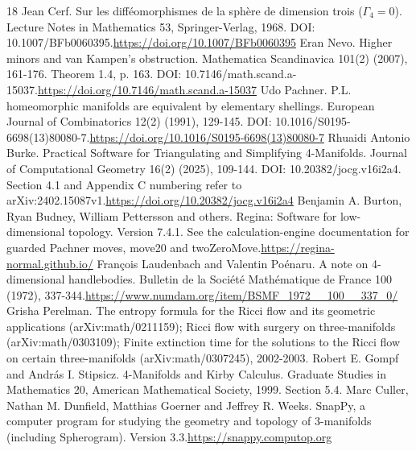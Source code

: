 \documentclass[11pt,letterpaper]{article}
\begin{document}
\begin{thebibliography}{18}
 Jean Cerf. Sur les difféomorphismes de la sphère de dimension trois ($\Gamma_4=0$). Lecture Notes in Mathematics 53, Springer-Verlag, 1968. DOI: 10.1007/BFb0060395.\newline\url{https://doi.org/10.1007/BFb0060395}
 Eran Nevo. Higher minors and van Kampen's obstruction. Mathematica Scandinavica 101(2) (2007), 161-176. Theorem 1.4, p. 163. DOI: 10.7146/math.scand.a-15037.\newline\url{https://doi.org/10.7146/math.scand.a-15037}
 Udo Pachner. P.L. homeomorphic manifolds are equivalent by elementary shellings. European Journal of Combinatorics 12(2) (1991), 129-145. DOI: 10.1016/S0195-6698(13)80080-7.\newline\url{https://doi.org/10.1016/S0195-6698(13)80080-7}
 Rhuaidi Antonio Burke. Practical Software for Triangulating and Simplifying 4-Manifolds. Journal of Computational Geometry 16(2) (2025), 109-144. DOI: 10.20382/jocg.v16i2a4. Section 4.1 and Appendix C numbering refer to arXiv:2402.15087v1.\newline\url{https://doi.org/10.20382/jocg.v16i2a4}
 Benjamin A. Burton, Ryan Budney, William Pettersson and others. Regina: Software for low-dimensional topology. Version 7.4.1. See the calculation-engine documentation for guarded Pachner moves, move20 and twoZeroMove.\newline\url{https://regina-normal.github.io/}
 François Laudenbach and Valentin Poénaru. A note on 4-dimensional handlebodies. Bulletin de la Société Mathématique de France 100 (1972), 337-344.\newline\url{https://www.numdam.org/item/BSMF_1972__100__337_0/}
 Grisha Perelman. The entropy formula for the Ricci flow and its geometric applications (arXiv:math/0211159); Ricci flow with surgery on three-manifolds (arXiv:math/0303109); Finite extinction time for the solutions to the Ricci flow on certain three-manifolds (arXiv:math/0307245), 2002-2003.
 Robert E. Gompf and András I. Stipsicz. 4-Manifolds and Kirby Calculus. Graduate Studies in Mathematics 20, American Mathematical Society, 1999. Section 5.4.
 Marc Culler, Nathan M. Dunfield, Matthias Goerner and Jeffrey R. Weeks. SnapPy, a computer program for studying the geometry and topology of 3-manifolds (including Spherogram). Version 3.3.\newline\url{https://snappy.computop.org}
\end{thebibliography}
\end{document}
